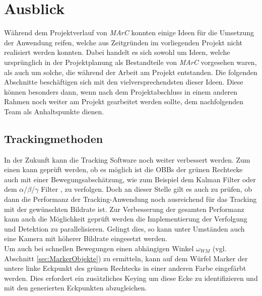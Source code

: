 \section{Ausblick}\label{sec:ausblick}
Während dem Projektverlauf von \emph{MArC} konnten einige Ideen für die Umsetzung der Anwendung reifen, welche aus Zeitgründen im vorliegenden Projekt nicht realisiert werden konnten. Dabei handelt es sich sowohl um Ideen, welche ursprünglich in der Projektplanung als Bestandteile von \emph{MArC} vorgesehen waren, als auch um solche, die während der Arbeit am Projekt entstanden. Die folgenden Abschnitte beschäftigen sich mit den vielversprechendsten dieser Ideen. Diese können besonders dann, wenn nach dem Projektabschluss in einem anderen Rahmen noch weiter am Projekt gearbeitet werden sollte, dem nachfolgenden Team als Anhaltspunkte dienen.
\subsection{Trackingmethoden}
In der Zukunft kann die Tracking Software noch weiter verbessert werden. Zum einen kann geprüft werden, ob es möglich ist die OBBs der grünen Rechtecke auch mit einer Bewegungsabschätzung, wie zum Beispiel dem Kalman Filter \cite{article:Kalman} oder dem $\alpha$/$\beta$/$\gamma$ Filter \cite{article:alphabetagamma}, zu verfolgen. Doch an dieser Stelle gilt es auch zu prüfen, ob dann die Performanz der Tracking-Anwendung noch ausreichend für das Tracking mit der gewünschten Bildrate ist. Zur Verbesserung der gesamten Performanz kann auch die Möglichkeit geprüft werden die Implementierung der Verfolgung und Detektion zu parallelisieren. Gelingt dies, so kann unter Umständen auch eine Kamera mit höherer Bildrate eingesetzt werden.\\
Um auch bei schnellen Bewegungen einen abhängigen Winkel $\omega_{WM}$ (vgl. Abschnitt \ref{sec:MarkerObjekte}) zu ermitteln, kann auf dem Würfel Marker der untere linke Eckpunkt des grünen Rechtecks in einer anderen Farbe eingefärbt werden. Dies erfordert ein zusätzliches Keying um diese Ecke zu identifizieren und mit den generierten Eckpunkten abzugleichen.


